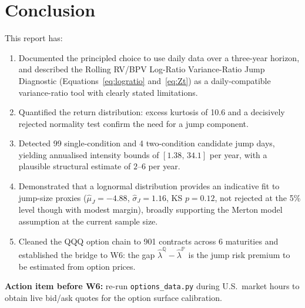 \documentclass[11pt,a4paper]{article}
\begin{document}
\section{Conclusion}

This report has:
\begin{enumerate}[label=\arabic*.]
  \item Documented the principled choice to use daily data over a three-year horizon, and described the Rolling RV/BPV Log-Ratio Variance-Ratio Jump Diagnostic (Equations~\eqref{eq:logratio} and~\eqref{eq:Zt}) as a daily-compatible variance-ratio tool with clearly stated limitations.
  \item Quantified the return distribution: excess kurtosis of 10.6 and a decisively rejected normality test confirm the need for a jump component.
  \item Detected 99 single-condition and 4 two-condition candidate jump days, yielding annualised intensity bounds of $[1.38,\,34.1]$ per year, with a plausible structural estimate of $2$--$6$ per year.
  \item Demonstrated that a lognormal distribution provides an indicative fit to jump-size proxies ($\hat{\mu}_J=-4.88$, $\hat{\sigma}_J=1.16$, KS $p=0.12$, not rejected at the 5\% level though with modest margin), broadly supporting the Merton model assumption at the current sample size.
  \item Cleaned the QQQ option chain to 901 contracts across 6 maturities and established the bridge to W6: the gap $\hat{\lambda}^{\mathbb{Q}}-\hat{\lambda}^{\mathbb{P}}$ is the jump risk premium to be estimated from option prices.
\end{enumerate}

\bigskip
\noindent\textbf{Action item before W6:} re-run \texttt{options\_data.py} during U.S.\ market hours to obtain live bid/ask quotes for the option surface calibration.
\end{document}
